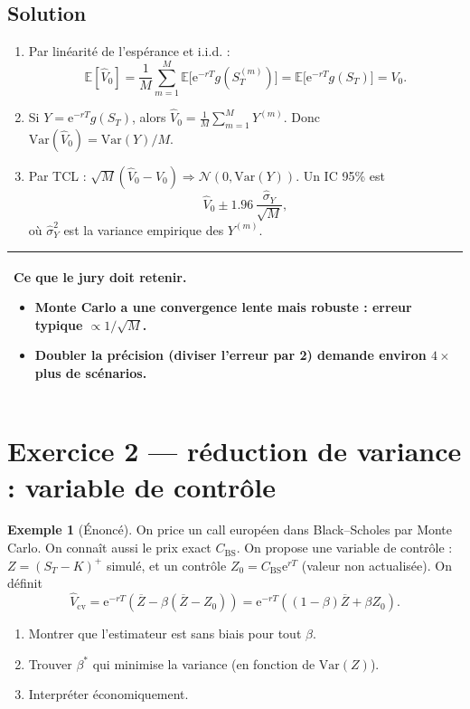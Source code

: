 \documentclass[11pt,a4paper]{report}
\newcommand{\ee}{\mathrm{e}}
\newcommand{\E}{\mathbb{E}}
\newcommand{\Var}{\mathrm{Var}}
\newcommand{\1}{\mathbbm{1}}
\newcommand{\Normal}{\mathcal{N}}
\newcommand{\BS}{\mathrm{BS}}
\theoremstyle{definition}
\newtheorem{example}{Exemple}[chapter]
\theoremstyle{plain}
\theoremstyle{remark}
\newenvironment{jurybox}{%
  \begin{center}
  \setlength{\tabcolsep}{6pt}%
  \renewcommand{\arraystretch}{1.1}%
  \begin{tabular}{|p{0.94\textwidth}|}
  \hline
  \small\textbf{Ce que le jury doit retenir.}\par\medskip
}{%
  \\ \hline
  \end{tabular}
  \end{center}
}
\begin{document}
\subsection*{Solution}
\begin{enumerate}[label=\alph*)]
  \item Par linéarité de l'espérance et i.i.d. :
  \[\E[\widehat{V}_0]=\frac{1}{M}\sum_{m=1}^M \E\bigl[\ee^{-rT} g(S_T^{(m)})\bigr]=\E\bigl[\ee^{-rT}g(S_T)\bigr]=V_0.
  \]
  \item Si $Y=\ee^{-rT}g(S_T)$, alors $\widehat{V}_0=\frac{1}{M}\sum_{m=1}^M Y^{(m)}$.
  Donc $\Var(\widehat{V}_0)=\Var(Y)/M$.
  \item Par TCL : $\sqrt{M}(\widehat{V}_0-V_0)\Rightarrow \Normal(0,\Var(Y))$.
  Un IC 95\% est
  \[\widehat{V}_0 \pm 1.96\,\frac{\widehat{\sigma}_Y}{\sqrt{M}},\]
  où $\widehat{\sigma}_Y^2$ est la variance empirique des $Y^{(m)}$.
\end{enumerate}

\begin{jurybox}
\begin{itemize}
  \item Monte Carlo a une convergence lente mais robuste : erreur typique $\propto 1/\sqrt{M}$.
  \item Doubler la précision (diviser l'erreur par 2) demande environ \(4\times\) plus de scénarios.
\end{itemize}
\end{jurybox}

\section{Exercice 2 --- réduction de variance : variable de contrôle}
\begin{example}[Énoncé]
On price un call européen dans Black--Scholes par Monte Carlo. On connaît aussi le prix exact $C_{\BS}$.
On propose une variable de contrôle : $Z=(S_T-K)^+$ simulé, et un contrôle $Z_0=C_{\BS}\ee^{rT}$ (valeur non actualisée).
On définit
\[\widehat{V}_{\mathrm{cv}} = \ee^{-rT}\left(\overline{Z} - \beta(\overline{Z}-Z_0)\right)
=\ee^{-rT}\left((1-\beta)\overline{Z}+\beta Z_0\right).
\]
\begin{enumerate}[label=\alph*)]
  \item Montrer que l'estimateur est sans biais pour tout $\beta$.
  \item Trouver $\beta^*$ qui minimise la variance (en fonction de $\Var(Z)$).
  \item Interpréter économiquement.
\end{enumerate}
\end{example}
\end{document}
